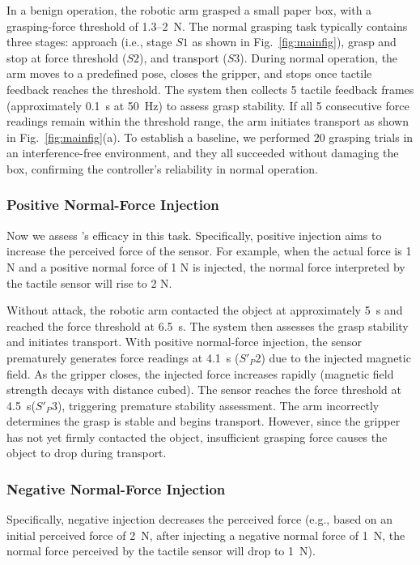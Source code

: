 In a benign operation, the robotic arm grasped a small paper box, with a grasping-force threshold of 1.3--2~N. The normal grasping task typically contains three stages: approach (i.e., stage $S1$ as shown in Fig.~\ref{fig:mainfig}), grasp and stop at force threshold ($S2$), and transport ($S3$). During normal operation, the arm moves to a predefined pose, closes the gripper, and stops once tactile feedback reaches the threshold. The system then collects 5 tactile feedback frames (approximately 0.1~s at 50~Hz) to assess grasp stability. If all 5 consecutive force readings remain within the threshold range, the arm initiates transport as shown in Fig.~\ref{fig:mainfig}(a).
To establish a baseline, we performed 20 grasping trials in an interference-free environment, and they all succeeded without damaging the box, confirming the controller's reliability in normal operation.

\subsubsection{Positive Normal-Force Injection}
Now we assess {\name}'s efficacy in this task. Specifically, positive injection aims to increase the perceived force of the sensor.
For example, when the actual force is 1 N and a positive normal force of 1 N is injected, the normal force interpreted by the tactile sensor will rise to 2 N.

Without attack, the robotic arm contacted the object at approximately 5~s and reached the force threshold at 6.5~s. The system then assesses the grasp stability and initiates transport.
With positive normal-force injection, the sensor prematurely generates force readings at 4.1~s ($S'_P2$) due to the injected magnetic field. As the gripper closes, the injected force increases rapidly (magnetic field strength decays with distance cubed). The sensor reaches the force threshold at 4.5~s($S'_P3$), triggering premature stability assessment. The arm incorrectly determines the grasp is stable and begins transport. However, since the gripper has not yet firmly contacted the object, insufficient grasping force causes the object to drop during transport.

\subsubsection{Negative Normal-Force Injection}
Specifically, negative injection decreases the perceived force (e.g., based on an initial perceived force of 2~N, after injecting a negative normal force of 1~N, the normal force perceived by the tactile sensor will drop to 1~N).


